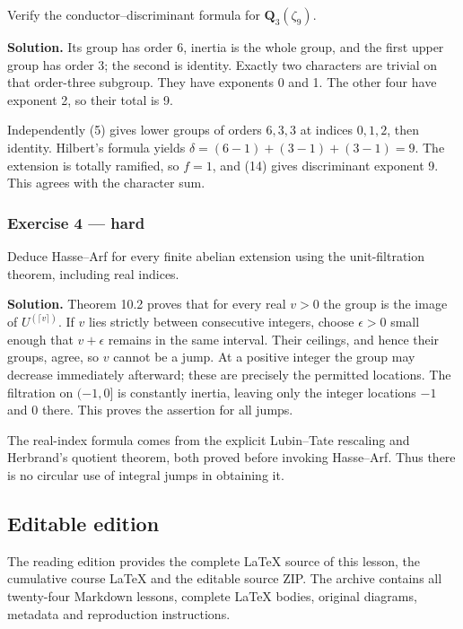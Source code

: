 \documentclass[11pt,a4paper]{article}
\begin{document}
Verify the conductor--discriminant formula for \(\mathbf Q_3(\zeta_9)\).

\textbf{Solution.} Its group has order 6, inertia is the whole group,
and the first upper group has order 3; the second is identity. Exactly
two characters are trivial on that order-three subgroup. They have
exponents 0 and 1. The other four have exponent 2, so their total is 9.

Independently (5) gives lower groups of orders \(6,3,3\) at indices
\(0,1,2\), then identity. Hilbert's formula yields
\(\delta=(6-1)+(3-1)+(3-1)=9\). The extension is totally ramified, so
\(f=1\), and (14) gives discriminant exponent 9. This agrees with the
character sum.

\subsubsection{Exercise 4 --- hard}\label{exercise-4-hard}

Deduce Hasse--Arf for every finite abelian extension using the
unit-filtration theorem, including real indices.

\textbf{Solution.} Theorem 10.2 proves that for every real \(v>0\) the
group is the image of \(U^{(\lceil v\rceil)}\). If \(v\) lies strictly
between consecutive integers, choose \(\epsilon>0\) small enough that
\(v+\epsilon\) remains in the same interval. Their ceilings, and hence
their groups, agree, so \(v\) cannot be a jump. At a positive integer
the group may decrease immediately afterward; these are precisely the
permitted locations. The filtration on \((-1,0]\) is constantly inertia,
leaving only the integer locations \(-1\) and 0 there. This proves the
assertion for all jumps.

The real-index formula comes from the explicit Lubin--Tate rescaling and
Herbrand's quotient theorem, both proved before invoking Hasse--Arf.
Thus there is no circular use of integral jumps in obtaining it.

\subsection{Editable edition}\label{editable-edition}

The reading edition provides the complete LaTeX source of this lesson,
the cumulative course LaTeX and the editable source ZIP. The archive
contains all twenty-four Markdown lessons, complete LaTeX bodies,
original diagrams, metadata and reproduction instructions.
\end{document}
